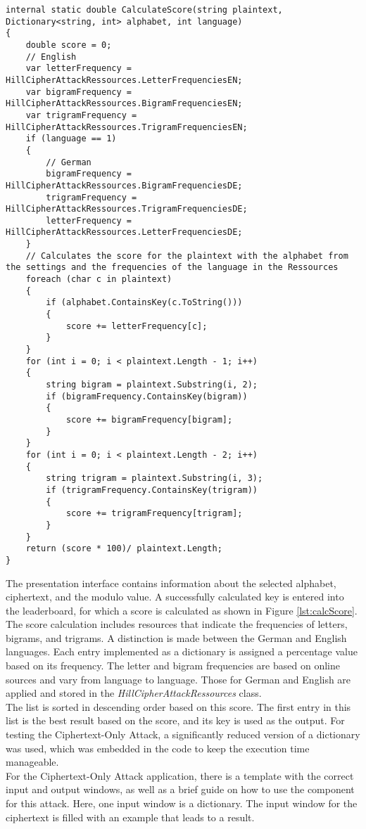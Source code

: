 \documentclass[conference]{IEEEtran}
\begin{document}
\begin{lstlisting}[caption={CalculateScore method}, label={lst:calcScore}]
internal static double CalculateScore(string plaintext, Dictionary<string, int> alphabet, int language)
{
    double score = 0;
    // English
    var letterFrequency = HillCipherAttackRessources.LetterFrequenciesEN;
    var bigramFrequency = HillCipherAttackRessources.BigramFrequenciesEN;
    var trigramFrequency = HillCipherAttackRessources.TrigramFrequenciesEN;
    if (language == 1)
    {
        // German
        bigramFrequency = HillCipherAttackRessources.BigramFrequenciesDE;
        trigramFrequency = HillCipherAttackRessources.TrigramFrequenciesDE;
        letterFrequency = HillCipherAttackRessources.LetterFrequenciesDE;
    }
    // Calculates the score for the plaintext with the alphabet from the settings and the frequencies of the language in the Ressources
    foreach (char c in plaintext)
    {
        if (alphabet.ContainsKey(c.ToString()))
        {
            score += letterFrequency[c];
        }
    }
    for (int i = 0; i < plaintext.Length - 1; i++)
    {
        string bigram = plaintext.Substring(i, 2);
        if (bigramFrequency.ContainsKey(bigram))
        {
            score += bigramFrequency[bigram];
        }
    }
    for (int i = 0; i < plaintext.Length - 2; i++)
    {
        string trigram = plaintext.Substring(i, 3);
        if (trigramFrequency.ContainsKey(trigram))
        {
            score += trigramFrequency[trigram];
        }
    }
    return (score * 100)/ plaintext.Length;
}
\end{lstlisting}

The presentation interface contains information about the selected alphabet, ciphertext, and the modulo value. A successfully calculated key is entered into the leaderboard, for which a score is calculated as shown in Figure  \ref{lst:calcScore}. 
The score calculation includes resources that indicate the frequencies of letters, bigrams, and trigrams. A distinction is made between the German and English languages. Each entry implemented as a dictionary is assigned a percentage value based on its frequency. The letter and bigram frequencies are based on online sources \cite{b6} and vary from language to language. Those for German and English are applied and stored in the  \textit{HillCipherAttackRessources} class.
\\
The list is sorted in descending order based on this score. The first entry in this list is the best result based on the score, and its key is used as the output. For testing the Ciphertext-Only Attack, a significantly reduced version of a dictionary was used, which was embedded in the code to keep the execution time manageable.
\\
For the Ciphertext-Only Attack application, there is a template with the correct input and output windows, as well as a brief guide on how to use the component for this attack. Here, one input window is a dictionary. The input window for the ciphertext is filled with an example that leads to a result.
\\
\end{document}
